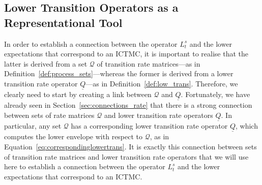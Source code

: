 \documentclass[10pt,a4paper]{paper}
\theoremstyle{definition}
\newcommand{\rateset}{\mathcal{Q}}
\newcommand{\lrate}{\underline{Q}}
\newcommand{\ictmc}{{ICTMC}}
\begin{document}






\subsection{Lower Transition Operators as a Representational Tool}\label{sec:single_var_lower_exp}



In order to establish a connection between the operator $L_t^s$ and the lower expectations that correspond to an \ictmc, it is important to realise that the latter is derived from a set $\rateset$ of transition rate matrices---as in Definition~\ref{def:process_sets}---whereas the former is derived from a lower transition rate operator $\lrate$---as in Definition~\ref{def:low_trans}. Therefore, we clearly need to start by creating a link between $\rateset$ and $\lrate$. Fortunately, we have already seen in Section~\ref{sec:connections_rate} that there is a strong connection between sets of rate matrices $\rateset$ and lower transition rate operators $\lrate$. In particular, any set $\rateset$ has a corresponding lower transition rate operator $\lrate$, which computes the lower envelope with respect to $\rateset$, as in Equation~\eqref{eq:correspondinglowertrans}. It is exactly this connection between sets of transition rate matrices and lower transition rate operators that we will use here to establish a connection between the operator $L_t^s$ and the lower expectations that correspond to an \ictmc.
\end{document}
